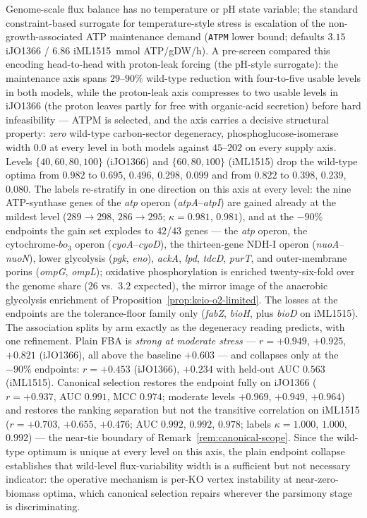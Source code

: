 \begin{proposition}
\label{prop:keio-atpm}
Genome-scale flux balance has no temperature or pH state variable;
the standard constraint-based surrogate for temperature-style
stress is escalation of the non-growth-associated ATP maintenance
demand (\texttt{ATPM} lower bound; defaults $3.15$ iJO1366 /
$6.86$ iML1515~mmol ATP/gDW/h). A pre-screen compared this
encoding head-to-head with proton-leak forcing (the pH-style
surrogate): the maintenance axis spans $29$--$90\%$ wild-type
reduction with four-to-five usable levels in both models, while
the proton-leak axis compresses to two usable levels in iJO1366
(the proton leaves partly for free with organic-acid secretion)
before hard infeasibility --- ATPM is selected, and the axis
carries a decisive structural property: \emph{zero} wild-type
carbon-sector degeneracy, phosphoglucose-isomerase width $0.0$ at
every level in both models against $45$--$202$ on every supply
axis. Levels $\{40,60,80,100\}$ (iJO1366) and $\{60,80,100\}$
(iML1515) drop the wild-type optima from $0.982$ to $0.695$,
$0.496$, $0.298$, $0.099$ and from $0.822$ to $0.398$, $0.239$,
$0.080$. The labels re-stratify in one direction on this axis at
every level: the nine ATP-synthase genes of the \emph{atp} operon
(\emph{atpA}--\emph{atpI}) are gained already at the mildest level
($289\to298$, $286\to295$; $\kappa=0.981$, $0.981$), and at the
$-90\%$ endpoints the gain set explodes to $42$/$43$ genes ---
the \emph{atp} operon, the cytochrome-$bo_3$ operon
(\emph{cyoA}--\emph{cyoD}), the thirteen-gene NDH-I operon
(\emph{nuoA}--\emph{nuoN}), lower glycolysis (\emph{pgk},
\emph{eno}), \emph{ackA}, \emph{lpd}, \emph{tdcD}, \emph{purT},
and outer-membrane porins (\emph{ompG}, \emph{ompL}); oxidative
phosphorylation is enriched twenty-six-fold over the genome share
($26$ vs.\ $3.2$ expected), the mirror image of the anaerobic
glycolysis enrichment of
Proposition~\ref{prop:keio-o2-limited}. The losses at the
endpoints are the tolerance-floor family only (\emph{fabZ},
\emph{bioH}, plus \emph{bioD} on iML1515). The association splits
by arm exactly as the degeneracy reading predicts, with one
refinement. Plain FBA is \emph{strong at moderate stress} ---
$r=+0.949$, $+0.925$, $+0.821$ (iJO1366), all above the baseline
$+0.603$ --- and collapses only at the $-90\%$ endpoints:
$r=+0.453$ (iJO1366), $+0.234$ with held-out AUC $0.563$
(iML1515). Canonical selection restores the endpoint fully on
iJO1366 ($r=+0.937$, AUC $0.991$, MCC $0.974$; moderate levels
$+0.969$, $+0.949$, $+0.964$) and restores the ranking separation
but not the transitive correlation on iML1515 ($r=+0.703$,
$+0.655$, $+0.476$; AUC $0.992$, $0.992$, $0.978$; labels
$\kappa=1.000$, $1.000$, $0.992$) --- the near-tie boundary of
Remark~\ref{rem:canonical-scope}. Since the wild-type optimum is
unique at every level on this axis, the plain endpoint collapse
establishes that wild-level flux-variability width is a sufficient
but not necessary indicator: the operative mechanism is per-KO
vertex instability at near-zero-biomass optima, which canonical
selection repairs wherever the parsimony stage is discriminating.
\end{proposition}

